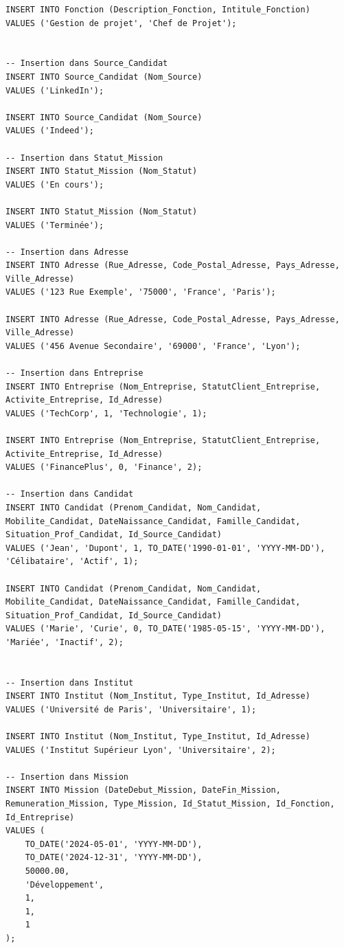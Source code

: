 \documentclass[a4paper,12pt]{article}
\begin{document}
\begin{verbatim}
INSERT INTO Fonction (Description_Fonction, Intitule_Fonction)
VALUES ('Gestion de projet', 'Chef de Projet');


-- Insertion dans Source_Candidat
INSERT INTO Source_Candidat (Nom_Source)
VALUES ('LinkedIn');

INSERT INTO Source_Candidat (Nom_Source)
VALUES ('Indeed');

-- Insertion dans Statut_Mission
INSERT INTO Statut_Mission (Nom_Statut)
VALUES ('En cours');

INSERT INTO Statut_Mission (Nom_Statut)
VALUES ('Terminée');

-- Insertion dans Adresse
INSERT INTO Adresse (Rue_Adresse, Code_Postal_Adresse, Pays_Adresse, Ville_Adresse)
VALUES ('123 Rue Exemple', '75000', 'France', 'Paris');

INSERT INTO Adresse (Rue_Adresse, Code_Postal_Adresse, Pays_Adresse, Ville_Adresse)
VALUES ('456 Avenue Secondaire', '69000', 'France', 'Lyon');

-- Insertion dans Entreprise
INSERT INTO Entreprise (Nom_Entreprise, StatutClient_Entreprise, Activite_Entreprise, Id_Adresse)
VALUES ('TechCorp', 1, 'Technologie', 1);

INSERT INTO Entreprise (Nom_Entreprise, StatutClient_Entreprise, Activite_Entreprise, Id_Adresse)
VALUES ('FinancePlus', 0, 'Finance', 2);

-- Insertion dans Candidat
INSERT INTO Candidat (Prenom_Candidat, Nom_Candidat, Mobilite_Candidat, DateNaissance_Candidat, Famille_Candidat, Situation_Prof_Candidat, Id_Source_Candidat)
VALUES ('Jean', 'Dupont', 1, TO_DATE('1990-01-01', 'YYYY-MM-DD'), 'Célibataire', 'Actif', 1);

INSERT INTO Candidat (Prenom_Candidat, Nom_Candidat, Mobilite_Candidat, DateNaissance_Candidat, Famille_Candidat, Situation_Prof_Candidat, Id_Source_Candidat)
VALUES ('Marie', 'Curie', 0, TO_DATE('1985-05-15', 'YYYY-MM-DD'), 'Mariée', 'Inactif', 2);


-- Insertion dans Institut
INSERT INTO Institut (Nom_Institut, Type_Institut, Id_Adresse)
VALUES ('Université de Paris', 'Universitaire', 1);

INSERT INTO Institut (Nom_Institut, Type_Institut, Id_Adresse)
VALUES ('Institut Supérieur Lyon', 'Universitaire', 2);

-- Insertion dans Mission
INSERT INTO Mission (DateDebut_Mission, DateFin_Mission, Remuneration_Mission, Type_Mission, Id_Statut_Mission, Id_Fonction, Id_Entreprise)
VALUES (
    TO_DATE('2024-05-01', 'YYYY-MM-DD'), 
    TO_DATE('2024-12-31', 'YYYY-MM-DD'), 
    50000.00, 
    'Développement', 
    1, 
    1, 
    1
);


\end{verbatim}
\end{document}
